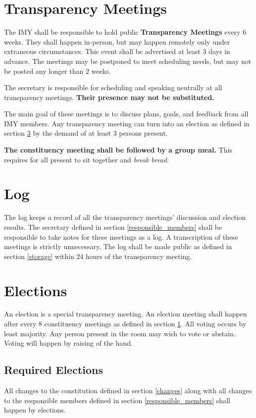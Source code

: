 \documentclass{article}
\begin{document}
\section{Transparency Meetings}
\label{transparency_meetings}

The IMY shall be responsible to hold public \textbf{Transparency Meetings} every
6
weeks.
They shall happen in-person, but may happen remotely only under extraneous circumstances.
This event shall be advertised at least
3
days in advance.
The meetings may be postponed to meet scheduling needs, but may not be posted any longer than
2
weeks.

The secretary is responsible for scheduling and speaking neutrally at all transparency meetings.
\textbf{Their presence may not be substituted.}

The main goal of these meetings is to discuss plans, goals, and feedback from all IMY members.
Any transparency meeting can turn into an election as defined in section \ref{elections} by the demand of at least
3
persons present.

\textbf{The constituency meeting shall be followed by a group meal. }
This requires for all present to sit together and \textit{break bread}.

\section{Log}
\label{log}
The log keeps a record of all the transparency meetings' discussion and election results.
The secretary defined in section \ref{responsible_members} shall be responsible to take notes for these meetings as a log.
A transcription of these meetings is strictly unnecessary.
The log shall be made public as defined in section \ref{storage} within
24
hours of the transparency meeting.

\section{Elections}
\label{elections}
An election is a special transparency meeting.
An election meeting shall happen after every
8
constituency meetings as defined in section \ref{transparency_meetings}.
All voting occurs by least majority.
Any person present in the room may wish to vote or abstain.
Voting will happen by raising of the hand.

\subsection{Required Elections}
\label{required_voting}
All changes to the constitution defined in section \ref{changes}
along with all changes to the responsible members defined in section \ref{responsible_members} shall happen by elections.
\end{document}
